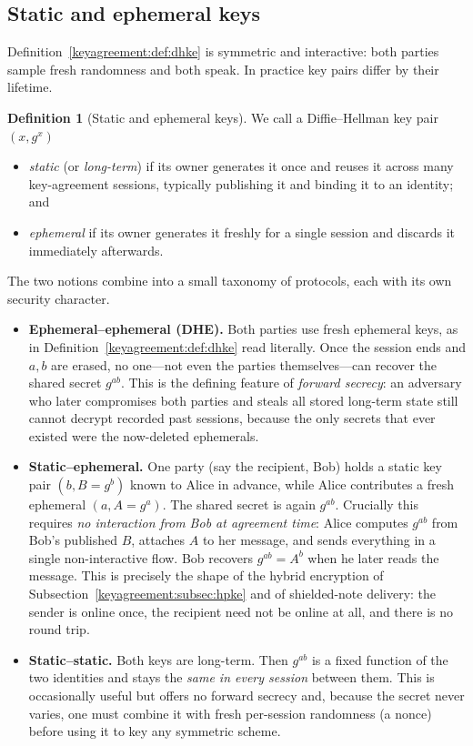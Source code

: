 \documentclass[11pt,a4paper]{article}
\theoremstyle{definition}
\newtheorem{definition}[theorem]{Definition}
\theoremstyle{remark}
\begin{document}
\subsection{Static and ephemeral keys}\label{keyagreement:subsec:staticephemeral}

Definition~\ref{keyagreement:def:dhke} is symmetric and interactive: both parties sample fresh randomness and both speak. In practice key pairs differ by their lifetime.

\begin{definition}[Static and ephemeral keys]\label{keyagreement:def:staticephemeral}
We call a Diffie--Hellman key pair \((x, g^x)\)
\begin{itemize}
  \item \emph{static} (or \emph{long-term}) if its owner generates it once and reuses it across many key-agreement sessions, typically publishing it and binding it to an identity; and
  \item \emph{ephemeral} if its owner generates it freshly for a single session and discards it immediately afterwards.
\end{itemize}
\end{definition}

The two notions combine into a small taxonomy of protocols, each with its own security character.

\begin{itemize}
  \item \textbf{Ephemeral--ephemeral (DHE).} Both parties use fresh ephemeral keys, as in Definition~\ref{keyagreement:def:dhke} read literally. Once the session ends and \(a, b\) are erased, no one---not even the parties themselves---can recover the shared secret \(g^{ab}\). This is the defining feature of \emph{forward secrecy}: an adversary who later compromises both parties and steals all stored long-term state still cannot decrypt recorded past sessions, because the only secrets that ever existed were the now-deleted ephemerals.
  \item \textbf{Static--ephemeral.} One party (say the recipient, Bob) holds a static key pair \((b, B = g^b)\) known to Alice in advance, while Alice contributes a fresh ephemeral \((a, A = g^a)\). The shared secret is again \(g^{ab}\). Crucially this requires \emph{no interaction from Bob at agreement time}: Alice computes \(g^{ab}\) from Bob's published \(B\), attaches \(A\) to her message, and sends everything in a single non-interactive flow. Bob recovers \(g^{ab} = A^b\) when he later reads the message. This is precisely the shape of the hybrid encryption of Subsection~\ref{keyagreement:subsec:hpke} and of shielded-note delivery: the sender is online once, the recipient need not be online at all, and there is no round trip.
  \item \textbf{Static--static.} Both keys are long-term. Then \(g^{ab}\) is a fixed function of the two identities and stays the \emph{same in every session} between them. This is occasionally useful but offers no forward secrecy and, because the secret never varies, one must combine it with fresh per-session randomness (a nonce) before using it to key any symmetric scheme.
\end{itemize}
\end{document}
